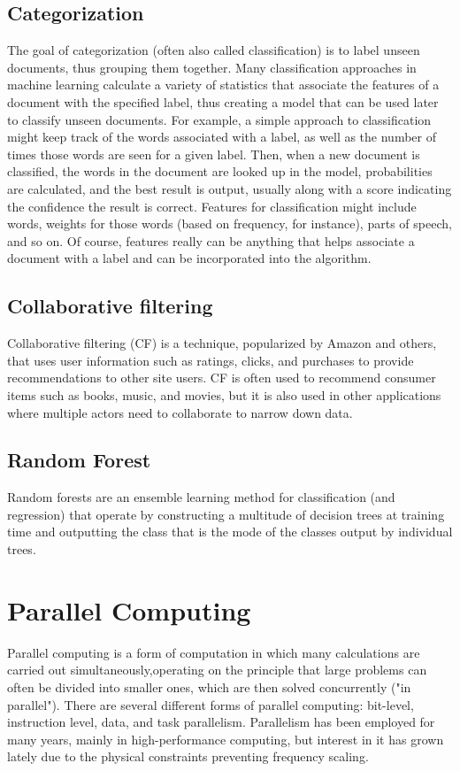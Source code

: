 \documentclass[12pt]{article}
\begin{document}
\subsection{Categorization}
The goal of categorization (often also called classification) is to label unseen documents, thus grouping them together. Many classification approaches in machine learning calculate a variety of statistics that associate the features of a document with the specified label, thus creating a model that can be used later to classify unseen documents. For example, a simple approach to classification might keep track of the words associated with a label, as well as the number of times those words are seen for a given label. Then, when a new document is classified, the words in the document are looked up in the model, probabilities are calculated, and the best result is output, usually along with a score indicating the confidence the result is correct.
Features for classification might include words, weights for those words (based on frequency, for instance), parts of speech, and so on. Of course, features really can be anything that helps associate a document with a label and can be incorporated into the algorithm.
\subsection{Collaborative filtering}
Collaborative filtering (CF) is a technique, popularized by Amazon and others, that uses user information such as ratings, clicks, and purchases to provide recommendations to other site users. CF is often used to recommend consumer items such as books, music, and movies, but it is also used in other applications where multiple actors need to collaborate to narrow down data. 

\subsection{Random Forest}
Random forests are an ensemble learning method for classification (and regression) that operate by constructing a multitude of decision trees at training time and outputting the class that is the mode of the classes output by individual trees. 
\newpage
\section{Parallel Computing}
Parallel computing is a form of computation in which many calculations are carried out simultaneously,operating on the principle that large problems can often be divided into smaller ones, which are then solved concurrently ("in parallel"). There are several different forms of parallel computing: bit-level, instruction level, data, and task parallelism. Parallelism has been employed for many years, mainly in high-performance computing, but interest in it has grown lately due to the physical constraints preventing frequency scaling.
\end{document}
